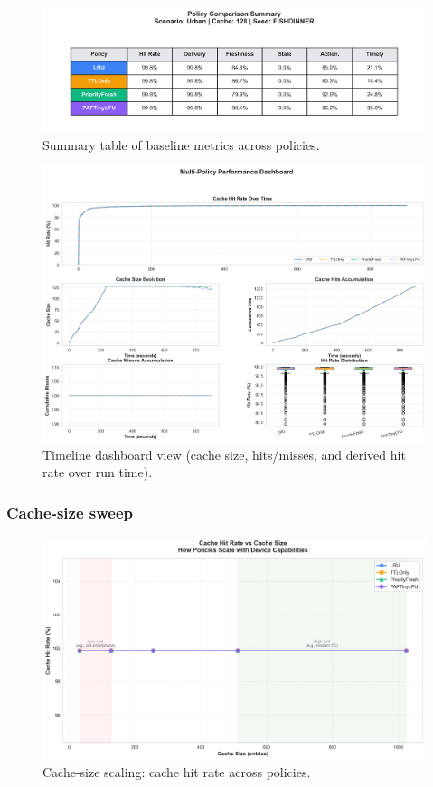 \documentclass[11pt,twocolumn]{article}
\begin{document}
\begin{figure}[h]
    \centering
    \includegraphics[width=\linewidth]{figures/metrics_summary_table.png}
    \caption{Summary table of baseline metrics across policies.}
    \label{fig:baseline-table}
\end{figure}

\begin{figure}[h]
    \centering
    \includegraphics[width=\linewidth]{figures/timeline_dashboard.png}
    \caption{Timeline dashboard view (cache size, hits/misses, and derived hit rate over run time).}
    \label{fig:timeline-dashboard}
\end{figure}

\subsubsection{Cache-size sweep}
\begin{figure}[h]
    \centering
    \includegraphics[width=\linewidth]{figures/device_scaling_cacheHitRate.png}
    \caption{Cache-size scaling: cache hit rate across policies.}
    \label{fig:device-scaling-cachehit}
\end{figure}
\end{document}
